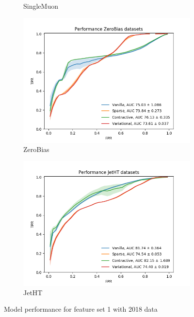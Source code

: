 \begin{figure}[h!]
\begin{subfigure}[b]{0.49\linewidth}
        \caption{SingleMuon}
    \end{subfigure}
    \begin{subfigure}[b]{0.49\linewidth}
        \includegraphics[width=\linewidth]{images/reco/2018/feature_1/performance_ZeroBias_VanillaSparseContractiveVariational.png}
        \caption{ZeroBias}
    \end{subfigure}
    \begin{subfigure}[b]{0.49\linewidth}
        \includegraphics[width=\linewidth]{images/reco/2018/feature_1/performance_JetHT_VanillaSparseContractiveVariational.png}
        \caption{JetHT}
    \end{subfigure}
    \caption{Model performance for feature set 1 with 2018 data}
\label{fig:2018_f1_ae_performance}
\end{figure}

